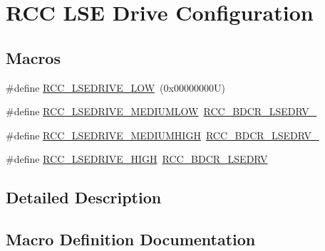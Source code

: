 \hypertarget{group___r_c_c_ex___l_s_e_drive___configuration}{}\section{R\+CC L\+SE Drive Configuration}
\label{group___r_c_c_ex___l_s_e_drive___configuration}
\subsection*{Macros}
\begin{DoxyCompactItemize}
\item 
\#define \hyperlink{group___r_c_c_ex___l_s_e_drive___configuration_gab5fa5b50304710db2d7f6d583a225da3}{R\+C\+C\+\_\+\+L\+S\+E\+D\+R\+I\+V\+E\+\_\+\+L\+OW}~(0x00000000\+U)
\item 
\#define \hyperlink{group___r_c_c_ex___l_s_e_drive___configuration_ga1151beb7f9869e91fe7617936ad0efff}{R\+C\+C\+\_\+\+L\+S\+E\+D\+R\+I\+V\+E\+\_\+\+M\+E\+D\+I\+U\+M\+L\+OW}~\hyperlink{group___peripheral___registers___bits___definition_gaa9a3c17caf7eb216d874b7cf1d90358e}{R\+C\+C\+\_\+\+B\+D\+C\+R\+\_\+\+L\+S\+E\+D\+R\+V\+\_}
\item 
\#define \hyperlink{group___r_c_c_ex___l_s_e_drive___configuration_ga295eed1e1368d526fa0f6356ceecbc48}{R\+C\+C\+\_\+\+L\+S\+E\+D\+R\+I\+V\+E\+\_\+\+M\+E\+D\+I\+U\+M\+H\+I\+GH}~\hyperlink{group___peripheral___registers___bits___definition_ga2bf168a5913ecf4eb6eb5f87a825aa58}{R\+C\+C\+\_\+\+B\+D\+C\+R\+\_\+\+L\+S\+E\+D\+R\+V\+\_}
\item 
\#define \hyperlink{group___r_c_c_ex___l_s_e_drive___configuration_ga90b0854f3813d7ab2781519bfa58fd95}{R\+C\+C\+\_\+\+L\+S\+E\+D\+R\+I\+V\+E\+\_\+\+H\+I\+GH}~\hyperlink{group___peripheral___registers___bits___definition_gaa9e761cf5e09906a38e9c7e8e750514c}{R\+C\+C\+\_\+\+B\+D\+C\+R\+\_\+\+L\+S\+E\+D\+RV}
\end{DoxyCompactItemize}


\subsection{Detailed Description}


\subsection{Macro Definition Documentation}
\mbox{\label{group___r_c_c_ex___l_s_e_drive___configuration_ga90b0854f3813d7ab2781519bfa58fd95}} 
